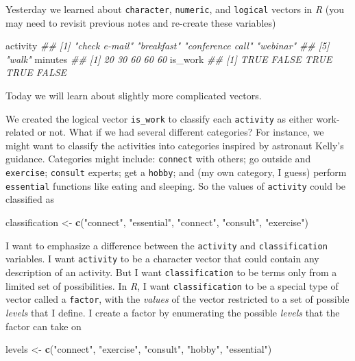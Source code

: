 \documentclass[
]{book}
\newenvironment{Shaded}{\begin{snugshade}}{\end{snugshade}}
\newcommand{\CommentTok}[1]{\textcolor[rgb]{0.56,0.35,0.01}{\textit{#1}}}
\newcommand{\KeywordTok}[1]{\textcolor[rgb]{0.13,0.29,0.53}{\textbf{#1}}}
\newcommand{\NormalTok}[1]{#1}
\newcommand{\StringTok}[1]{\textcolor[rgb]{0.31,0.60,0.02}{#1}}
\begin{document}
Yesterday we learned about \texttt{character}, \texttt{numeric}, and \texttt{logical} vectors in \emph{R} (you may need to revisit previous notes and re-create these variables)

\begin{Shaded}
\begin{Highlighting}[]
\NormalTok{activity}
\CommentTok{## [1] "check e-mail"    "breakfast"       "conference call" "webinar"        }
\CommentTok{## [5] "walk"}
\NormalTok{minutes}
\CommentTok{## [1] 20 30 60 60 60}
\NormalTok{is_work}
\CommentTok{## [1]  TRUE FALSE  TRUE  TRUE FALSE}
\end{Highlighting}
\end{Shaded}

Today we will learn about slightly more complicated vectors.

We created the logical vector \texttt{is\_work} to classify each \texttt{activity} as either work-related or not. What if we had several different categories? For instance, we might want to classify the activities into categories inspired by astronaut Kelly's guidance. Categories might include: \texttt{connect} with others; go outside and \texttt{exercise}; \texttt{consult} experts; get a \texttt{hobby}; and (my own category, I guess) perform \texttt{essential} functions like eating and sleeping. So the values of \texttt{activity} could be classified as

\begin{Shaded}
\begin{Highlighting}[]
\NormalTok{classification <-}
\StringTok{    }\KeywordTok{c}\NormalTok{(}\StringTok{"connect"}\NormalTok{, }\StringTok{"essential"}\NormalTok{, }\StringTok{"connect"}\NormalTok{, }\StringTok{"consult"}\NormalTok{, }\StringTok{"exercise"}\NormalTok{)}
\end{Highlighting}
\end{Shaded}

I want to emphasize a difference between the \texttt{activity} and \texttt{classification} variables. I want \texttt{activity} to be a character vector that could contain any description of an activity. But I want \texttt{classification} to be terms only from a limited set of possibilities. In \emph{R}, I want \texttt{classification} to be a special type of vector called a \texttt{factor}, with the \emph{values} of the vector restricted to a set of possible \emph{levels} that I define. I create a factor by enumerating the possible \emph{levels} that the factor can take on

\begin{Shaded}
\begin{Highlighting}[]
\NormalTok{levels <-}\StringTok{ }\KeywordTok{c}\NormalTok{(}\StringTok{"connect"}\NormalTok{, }\StringTok{"exercise"}\NormalTok{, }\StringTok{"consult"}\NormalTok{, }\StringTok{"hobby"}\NormalTok{, }\StringTok{"essential"}\NormalTok{)}
\end{Highlighting}
\end{Shaded}
\end{document}
